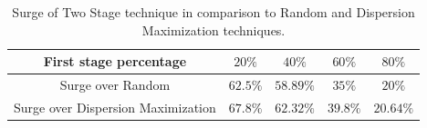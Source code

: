 \documentclass{acm_proc_article-sp}
\begin{document}
\begin{table}[!h]
\centering
\begin{tabulary}{0.5\textwidth}{|C|C|C|C|C|}
\hline
First stage percentage & $20\%$ & $40\%$  & $60\%$  & $80\%$  \\ \hline
Surge over Random   & $62.5\%$ & $58.89\%$  & $35\%$  & $20\%$  \\ \hline
Surge over Dispersion Maximization   & $67.8\%$ & $62.32\%$  & $39.8\%$  & $20.64\%$ \\ \hline
\end{tabulary}
\caption{Surge of Two Stage technique in comparison to Random and Dispersion Maximization techniques.}
\label{table:clusteredSurge}
\end{table}

\end{document}
